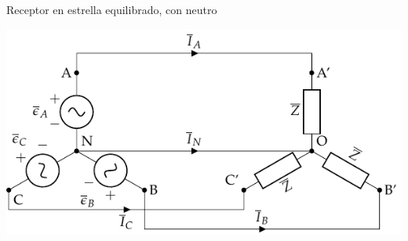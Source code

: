 \documentclass[aspectratio=169, usenames,svgnames,dvipsnames]{beamer}
\begin{document}
\begin{frame}{Receptor en estrella equilibrado, \hspace{3mm}con neutro}
    \begin{center}
        \includegraphics[width=.9\linewidth]{../figs/EstrellaEquilibrado.pdf}
    \end{center}
\end{frame}
    
\end{document}
